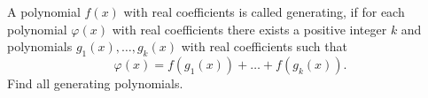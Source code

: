 A polynomial $f(x)$ with real coefficients is called generating, if for each polynomial $\varphi(x)$ with real coefficients there exists a positive integer $k$ and polynomials $g_1(x),\dotsc,g_k(x)$ with real coefficients such that\[\varphi(x)=f(g_1(x))+\dotsc+f(g_k(x)).\]Find all generating polynomials.